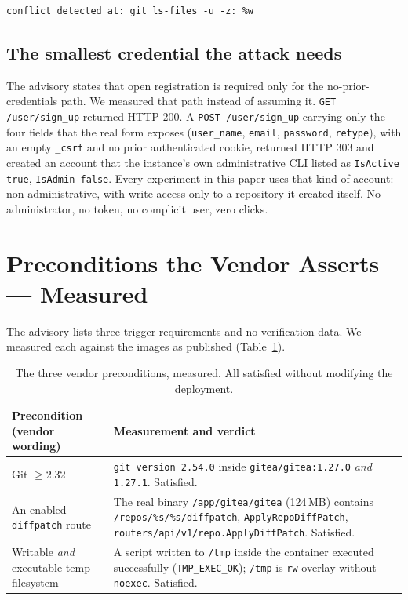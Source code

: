 \documentclass[journal]{IEEEtran}
\begin{document}
\begin{lstlisting}[style=transcript,
caption={Format string recovered from \texttt{/app/gitea/gitea} in the
\texttt{gitea/gitea:1.27.0} image (our measurement; not named in the advisory).
\texttt{git ls-files -u} is the unmerged-entry query of a three-way merge.},
label={lst:conflict}]
conflict detected at: git ls-files -u -z: %w
\end{lstlisting}

\subsection{The smallest credential the attack needs}
\label{sec:precond-cred}

The advisory states that open registration is required only for the
no-prior-credentials path. We measured that path instead of assuming it.
\texttt{GET /user/sign\_up} returned HTTP 200. A \texttt{POST /user/sign\_up}
carrying only the four fields that the real form exposes (\texttt{user\_name},
\texttt{email}, \texttt{password}, \texttt{retype}), with an empty
\texttt{\_csrf} and no prior authenticated cookie, returned HTTP 303 and created
an account that the instance's own administrative CLI listed as
\texttt{IsActive true}, \texttt{IsAdmin false}. Every experiment in this paper
uses that kind of account: non-administrative, with write access only to a
repository it created itself. No administrator, no token, no complicit user,
zero clicks.

\section{Preconditions the Vendor Asserts --- Measured}
\label{sec:precond}

The advisory lists three trigger requirements and no verification data. We
measured each against the images as published (Table~\ref{tab:precond}).

\begin{table}[t]
\centering
\footnotesize
\begin{tabular}{@{}p{2.2cm}p{5.4cm}@{}}
\toprule
Precondition (vendor wording) & Measurement and verdict \\
\midrule
Git $\geq$2.32 & \texttt{git version 2.54.0} inside \texttt{gitea/gitea:1.27.0}
\emph{and} \texttt{1.27.1}. Satisfied. \\
An enabled \texttt{diffpatch} route & The real binary
\texttt{/app/gitea/gitea} (124\,MB) contains
\texttt{/repos/\%s/\%s/diffpatch}, \texttt{ApplyRepoDiffPatch},
\texttt{routers/\allowbreak api/\allowbreak v1/\allowbreak repo.\allowbreak ApplyDiffPatch}. Satisfied. \\
Writable \emph{and} executable temp filesystem & A script written to
\texttt{/tmp} inside the container executed successfully
(\texttt{TMP\_EXEC\_OK}); \texttt{/tmp} is \texttt{rw} overlay without
\texttt{noexec}. Satisfied. \\
\bottomrule
\end{tabular}
\caption{The three vendor preconditions, measured. All satisfied without
modifying the deployment.}
\label{tab:precond}
\end{table}
\end{document}
